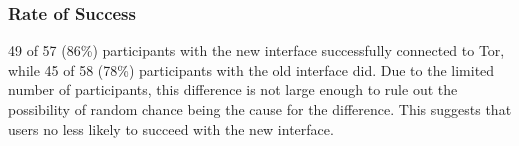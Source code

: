 \documentclass[USenglish,oneside,twocolumn]{article}
\begin{document}
\subsubsection{Rate of Success} 
49 of 57 (86\%) participants with the new interface successfully connected to Tor, while 45 of 58 (78\%) participants with the old interface did. 
Due to the limited number of participants, this difference is not large enough to rule out the possibility of random chance being the cause for the difference. This suggests that users no less likely to succeed with the new interface. 

\end{document}
